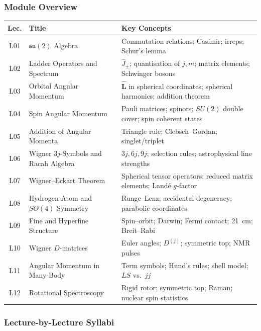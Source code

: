 \documentclass[11pt,a4paper]{article}
\begin{document}
\subsubsection*{Module Overview}
\begin{center}
\begin{tabularx}{\textwidth}{clX}
\toprule
\textbf{Lec.} & \textbf{Title} & \textbf{Key Concepts}\\
\midrule
L01 & $\mathfrak{su}(2)$ Algebra & Commutation relations; Casimir; irreps; Schur's lemma\\
L02 & Ladder Operators and Spectrum & $\hat{J}_\pm$; quantisation of $j,m$; matrix elements; Schwinger bosons\\
L03 & Orbital Angular Momentum & $\hat{\mathbf{L}}$ in spherical coordinates; spherical harmonics; addition theorem\\
L04 & Spin Angular Momentum & Pauli matrices; spinors; $SU(2)$ double cover; spin coherent states\\
L05 & Addition of Angular Momenta & Triangle rule; Clebsch--Gordan; singlet/triplet\\
L06 & Wigner $3j$-Symbols and Racah Algebra & $3j,6j,9j$; selection rules; astrophysical line strengths\\
L07 & Wigner--Eckart Theorem & Spherical tensor operators; reduced matrix elements; Land\'e $g$-factor\\
L08 & Hydrogen Atom and $SO(4)$ Symmetry & Runge--Lenz; accidental degeneracy; parabolic coordinates\\
L09 & Fine and Hyperfine Structure & Spin--orbit; Darwin; Fermi contact; 21~cm; Breit--Rabi\\
L10 & Wigner $D$-matrices & Euler angles; $D^{(j)}$; symmetric top; NMR pulses\\
L11 & Angular Momentum in Many-Body & Term symbols; Hund's rules; shell model; $LS$ vs.\ $jj$\\
L12 & Rotational Spectroscopy & Rigid rotor; symmetric top; Raman; nuclear spin statistics\\
\bottomrule
\end{tabularx}
\end{center}

\subsubsection*{Lecture-by-Lecture Syllabi}
\end{document}
